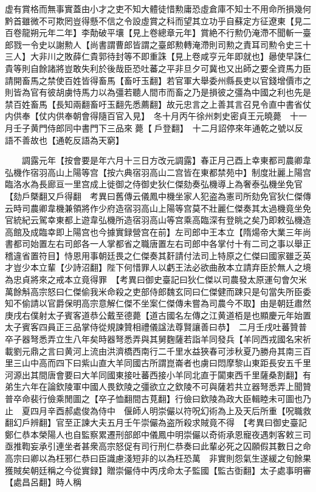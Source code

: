 虚有賞格而無事實蓋由小才之吏不知大體徒惜勲庸恐虛倉庫不知士不用命所損幾何黔首雖微不可欺罔豈得懸不信之令設虛賞之科而望其立功乎自蘇定方征遼東【見二百卷龍朔元年二年】李勣破平壤【見上卷總章元年】賞絶不行勲仍淹滯不聞斬一臺郎戮一令史以謝勲人【尚書謂曹郎皆謂之臺郎勲轉淹滯則司勲之責耳司勲令史三十三人】大非川之敗薛仁貴郭待封等不即重誅【見上卷咸亨元年即就也】曏使早誅仁貴等則自餘諸將豈敢失利於後哉臣恐吐蕃之平非旦夕可冀也又出師之要全資馬力臣請開畜馬之禁使百姓皆得畜馬【畜吁玉翻】若官軍大舉委州縣長吏以官錢增價市之則皆為官有彼胡虜恃馬力以為彊若聽人間市而畜之乃是損彼之彊為中國之利也先是禁百姓畜馬【長知兩翻畜吁玉翻先悉薦翻】故元忠言之上善其言召見令直中書省仗内供奉【仗内供奉朝會得隨百官入見】　冬十月丙午徐州刺史密貞王元曉薨　十一月壬子黄門侍郎同中書門下三品來薨【戶登翻】　十二月詔停來年通乾之號以反語不善故也【通乾反語為天窮】

　　調露元年【按會要是年六月十三日方改元調露】春正月己酉上幸東都司農卿韋弘機作宿羽高山上陽等宫【按六典宿羽高山二宫皆在東都禁苑中】制度壯麗上陽宫臨洛水為長廊亘一里宫成上徙御之侍御史狄仁傑劾奏弘機導上為奢泰弘機坐免官【劾戶槩翻又戶得翻　考異曰舊傳云儀鳳中機坐家人犯盗為憲司所劾免官狄仁傑傳云時司農卿韋機兼領將作少府造宿羽高山上陽等宫莫不壯麗仁傑奏其太過機竟坐免官統紀云駕幸東都上遊韋弘機所造宿羽高山等宫乘高臨深有登眺之矣乃即敕弘機造高館及成臨幸即上陽宫也今據實録營宫在前】左司郎中王本立【隋煬帝大業三年尚書都司始置左右司郎各一人掌都省之職唐置左右司郎中各掌付十有二司之事以舉正稽違省置符目】恃恩用事朝廷畏之仁傑奏其姧請付法司上特原之仁傑曰國家雖乏英才豈少本立輩【少詩沼翻】陛下何惜罪人以虧王法必欲曲赦本立請弃臣於無人之境為忠貞將來之戒本立竟得罪　【考異曰御史臺記曰狄仁傑以司農發太原運句會欠米萬餘斛高宗怒曰仁傑偷我米命殺之吏部侍郎魏玄同曰仁傑健而踈只是句當失所臣委知不偷請以官爵保明高宗意解仁傑不坐案仁傑傳未嘗為司農今不取】由是朝廷肅然　庚戌右僕射太子賓客道恭公戴至德薨【道古國名左傳之江黄道栢是也顯慶元年始置太子賓客四員正三品掌侍從規諫贊相禮儀諡法尊賢讓善曰恭】　二月壬戌吐蕃贊普卒子器弩悉弄立生八年矣時器弩悉弄與其舅麴薩若詣羊同發兵【羊同西戎國名宋祈載劉元鼎之言曰黄河上流由洪濟橋西南行二千里水益狹春可涉秋夏乃勝舟其南三百里三山中高而四下曰紫山直大羊同國古所謂崑崙者也虜曰悶摩黎山東距長安五千里河源出其間唐會要曰大羊同國東接吐蕃西接小羊同北直于闐東西千里薩桑割翻】有弟生六年在論欽陵軍中國人畏欽陵之彊欲立之欽陵不可與薩若共立器弩悉弄上聞贊普卒命裴行儉乘閒圖之【卒子恤翻間古莧翻】行儉曰欽陵為政大臣輯睦未可圖也乃止　夏四月辛酉郝處俊為侍中　偃師人明崇儼以符呪幻術為上及天后所重【呪職救翻幻戶辨翻】官至正諫大夫五月壬午崇儼為盗所殺求賊竟不得　【考異曰御史臺記鄭仁恭本榮陽人也自監察累遷刑部郎中儀鳳中明崇儼以奇術承恩寵夜遇刺客敕三司亟推鞫妄承引連坐者甚衆高宗怒促有司行刑仁恭奏曰此輩必死之囚願假其數日之命高宗曰卿以為枉邪仁恭曰臣識慮淺短非的以為枉恐萬　非實則怨氣生遂緩之旬餘果獲賊矣朝廷稱之今從實録】贈崇儼侍中丙戌命太子監國【監古衘翻】太子處事明審【處昌呂翻】時人稱


